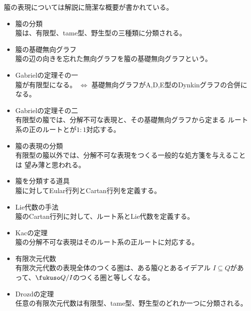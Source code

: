 {	箙の表現については解説\cite{derksen2005}に簡潔な概要が書かれている。
	\begin{itemize}\setlength{\itemsep}{-1mm} %
		\item 箙の分類 \\
		箙は、有限型、tame型、野生型の三種類に分類される。
		\item 箙の基礎無向グラフ \\
		箙の辺の向きを忘れた無向グラフを箙の基礎無向グラフという。
		\item Gabrielの定理その一 \\
		箙が有限型になる。 
		$\iff$ 基礎無向グラフがA,D,E型のDynkinグラフの合併になる。
		\item Gabrielの定理その二 \\
		有限型の箙では、分解不可な表現と、その基礎無向グラフから定まる
		ルート系の正のルートとが$1:1$対応する。
		\item 箙の表現の分類 \\
		有限型の箙以外では、分解不可な表現をつくる一般的な処方箋を与えることは
		望み薄と思われる。
		\item 箙を分類する道具 \\
		箙に対してEular行列とCartan行列を定義する。
		\item Lie代数の手法 \\
		箙のCartan行列に対して、ルート系とLie代数を定義する。
		\item Kacの定理 \\
		箙の分解不可な表現はそのルート系の正ルートに対応する。
		\item 有限次元代数 \\
		有限次元代数の表現全体のつくる圏は、ある箙$Q$とあるイデアル
		$I\subseteq Q$があって、$\fukuso Q/I$のつくる圏と等しくなる。
		\item Drozdの定理 \\
		任意の有限次元代数は有限型、tame型、野生型のどれか一つに分類される。
	\end{itemize} %
}
